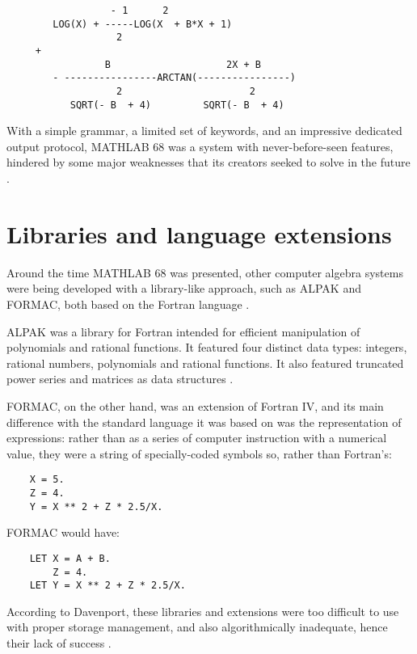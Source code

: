 \begin{verbatim}
                  - 1      2
        LOG(X) + -----LOG(X  + B*X + 1)
                   2
     + 
                 B                    2X + B
        - ----------------ARCTAN(----------------)
                   2                      2
           SQRT(- B  + 4)         SQRT(- B  + 4)
\end{verbatim}

With a simple grammar, a limited set of keywords, and an impressive dedicated output protocol, MATHLAB 68 was a system with never-before-seen features, hindered by some major weaknesses that its creators seeked to solve in the future \parencite{engelman1971legacy}.

\section{Libraries and language extensions}\label{sec:libraries-and-language-extensions}
Around the time MATHLAB 68 was presented, other computer algebra systems were being developed with a library-like approach, such as ALPAK and FORMAC, both based on the Fortran language \parencite{davenport1994computer}.

ALPAK was a library for Fortran intended for efficient manipulation of polynomials and rational functions. It featured four distinct data types: integers, rational numbers, polynomials and rational functions. It also featured truncated power series and matrices as data structures \parencite{brown1966language}.

FORMAC, on the other hand, was an extension of Fortran IV, and its main difference with the standard language it was based on was the representation of expressions: rather than as a series of computer instruction with a numerical value, they were a string of specially-coded symbols so, rather than Fortran's:

\begin{verbatim}
    X = 5.
    Z = 4.
    Y = X ** 2 + Z * 2.5/X.
\end{verbatim}

FORMAC would have:

\begin{verbatim}
    LET X = A + B.
        Z = 4.
    LET Y = X ** 2 + Z * 2.5/X.
\end{verbatim}

According to Davenport, these libraries and extensions were too difficult to use with proper storage management, and also algorithmically inadequate, hence their lack of success \parencite{davenport1994computer}.

